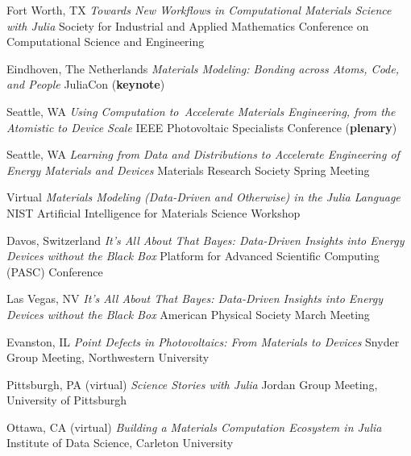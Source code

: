         {Fort Worth, TX}
        {\textit{Towards New Workflows in Computational Materials Science with Julia}}
        {Society for Industrial and Applied Mathematics Conference on Computational Science and Engineering}

        {Eindhoven, The Netherlands}
        {\textit{Materials Modeling: Bonding across Atoms, Code, and People}}
        {JuliaCon (\textbf{keynote})}

\vspace{\talksep}
\datedsubsection{}
        {Seattle, WA}
        {\textit{Using Computation to Accelerate Materials Engineering, from the Atomistic to Device Scale}}
        {IEEE Photovoltaic Specialists Conference (\textbf{plenary})}

\vspace{\talksep}
\datedsubsection{}
        {Seattle, WA}
        {\textit{Learning from Data and Distributions to Accelerate Engineering of Energy Materials and Devices}}
        {Materials Research Society Spring Meeting}

\vspace{\talkyearsep}
    {Virtual}
    {\textit{Materials Modeling (Data-Driven and Otherwise) in the Julia Language}}
    {NIST Artificial Intelligence for Materials Science Workshop}

\vspace{\talksep}
\datedsubsection{}
    {Davos, Switzerland}
    {\textit{It's All About That Bayes: Data-Driven Insights into Energy Devices without the Black Box}}
    {Platform for Advanced Scientific Computing (PASC) Conference}

\vspace{\talksep}
\datedsubsection{}
    {Las Vegas, NV}
    {\textit{It's All About That Bayes: Data-Driven Insights into Energy Devices without the Black Box}}
    {American Physical Society March Meeting}

\vspace{\talksep}
\datedsubsection{}
    {Evanston, IL}
    {\textit{Point Defects in Photovoltaics: From Materials to Devices}}
    {Snyder Group Meeting, Northwestern University}

\vspace{\talkyearsep}
    {Pittsburgh, PA (virtual)}
    {\textit{Science Stories with Julia}}
    {Jordan Group Meeting, University of Pittsburgh}

\vspace{\talksep}
\datedsubsection{}
    {Ottawa, CA (virtual)}
    {\textit{Building a Materials Computation Ecosystem in Julia}}
    {Institute of Data Science, Carleton University}

